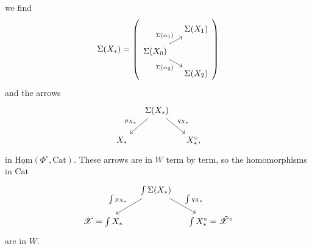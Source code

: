 \documentclass[11pt]{article}
\newcommand{\printedpage}[1]{\marginpar{\footnotesize p.~#1}}
\newcommand{\msp}[1]{\marginpar{\footnotesize [#1]}}
\newcommand{\Cat}{\mathrm{Cat}}
\newcommand{\Hom}{\mathrm{Hom}}
\newcommand{\sX}{\mathscr{X}}
\newcommand{\tsX}{\tilde{\mathscr{X}}}
\begin{document}
\msp{page 138}
we find
\[
\Sigma(X_*) =
\left(
\begin{tikzcd}[row sep=small, column sep=small]
 & \Sigma(X_1) \\
\Sigma(X_0) \arrow[ur, "\Sigma(\alpha_1)"] \arrow[dr, "\Sigma(\alpha_2)"'] & \\
 & \Sigma(X_2)
\end{tikzcd}
\right)
\]
and the arrows
\printedpage{94}
\[
\begin{tikzcd}[column sep=small]
 & \Sigma(X_*) \arrow[dl, "p_{X_*}"'] \arrow[dr, "q_{X_*}"] & \\
X_* & & X_*^\circ,
\end{tikzcd}
\]
in $\underline{\Hom}(\Phi^\circ,\Cat)$. These arrows are in $W$ term by term, so the homomorphisms in $\Cat$
\[
\begin{tikzcd}[column sep=small]
 & \int\Sigma(X_*) \arrow[dl, "\int p_{X_*}"'] \arrow[dr, "\int q_{X_*}"] & \\
\sX=\int X_* & & \int X_*^\circ=\tsX^\circ
\end{tikzcd}
\]
are in $W$.
\end{document}
